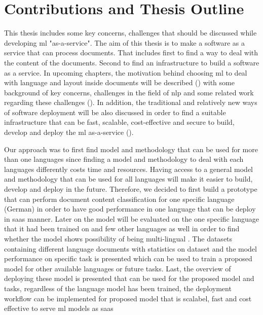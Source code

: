 \section{Contributions and Thesis Outline}
This thesis includes some key concerns, challenges that should be discussed while developing \acrlong{ml} "as-a-service". The aim of this thesis is to make a software as a service that can process documents. That includes first to find a way to deal with the content of the documents. Second to find an infrastructure to build a software as a service. In upcoming chapters, the motivation behind choosing \acrshort{ml} to deal with language and layout inside documents will be described () with some background of key concerns, challenges in the field of \acrshort{nlp} and some related work regarding these challenges (). In addition, the traditional and relatively new ways of software deployment will be also discussed in order to find a suitable infrastructure that can be fast, scalable, cost-effective and secure to build, develop and deploy the \acrshort{ml} as-a-service ().  

 Our approach was to first find model and methodology that can be used for more than one languages since finding a model and methodology to deal with each languages differently costs time and resources. Having access to a general model and methodology that can be used for all languages will make it easier to build, develop and deploy in the future. Therefore, we decided to first build a prototype that can perform document content classification for one specific language (German) in order to have good performance in one language that can be deploy in \acrshort{saas} manner. Later on the model will be evaluated on the one specific language that it had been trained on and few other languages as well in order to find whether the model shows possibility of being multi-lingual . The datasets containing different language documents with statistics on dataset and the model performance on specific task is presented which can be used to train a proposed model for other available languages or future tasks. Last, the overview of deploying these model is presented that can be used for the proposed model and tasks, regardless of the language model has been trained, the deployment workflow can be implemented for proposed model that is scalabel, fast and cost effective to serve \acrlong{ml} models as \acrlong{saas} 



